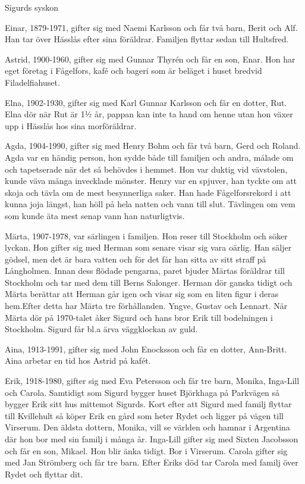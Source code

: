 Sigurds syskon


Einar, 1879-1971, gifter sig med Naemi  Karlsson och får två barn, Berit och Alf. Han tar över Hässlås efter sina föräldrar. Familjen flyttar sedan till Hultsfred.


Astrid, 1900-1960, gifter sig med Gunnar Thyrén och får en son, Enar. Hon har eget företag i Fågelfors, kafé och bageri som är beläget i huset bredvid Filadelfiahuset.


Elna, 1902-1930, gifter sig med Karl Gunnar Karlsson och får en dotter, Rut. Elna dör när Rut är 1½ år, pappan kan inte ta hand om henne utan hon växer upp i Hässlås hos sina morföräldrar.


Agda, 1904-1990, gifter sig med Henry Bohm och får två barn, Gerd och Roland. Agda var en händig person, hon sydde både till familjen och andra, målade om och tapetserade när det så behövdes i hemmet. Hon var duktig vid vävstolen, kunde väva många invecklade mönster. Henry var en spjuver, han tyckte om att skoja och tävla om de mest besynnerliga saker. Han hade Fågelforsrekord i att kunna joja längst, han höll på hela natten och vann till slut. Tävlingen om vem som kunde äta mest senap vann han naturligtvis.


Märta, 1907-1978, var särlingen i familjen. Hon reser till Stockholm och söker lyckan. Hon gifter sig med Herman som senare visar sig vara oärlig. Han säljer gödsel, men det är bara vatten och för det får han sitta av sitt straff på Långholmen. Innan dess flödade pengarna, paret bjuder Märtas föräldrar till Stockholm och tar med dem till Berns Salonger. Herman dör ganska tidigt och Märta berättar att Herman går igen och visar sig som en liten figur i deras hem.Efter detta har Märta tre förhållanden. Yngve, Gustav och Lennart. När Märta dör på 1970-talet åker Sigurd och hans bror Erik till bodelningen i Stockholm. Sigurd får bl.a ärva väggklockan av guld.


Aina, 1913-1991, gifter sig med John Enocksson och får en dotter, Ann-Britt. Aina arbetar en tid hos Astrid på kafét.


Erik, 1918-1980, gifter sig med Eva Petersson och får tre barn, Monika, Inga-Lill och Carola. Samtidigt som Sigurd bygger huset Björkhaga på Parkvägen så bygger Erik sitt hus mittemot Sigurds. Kort efter att Sigurd med familj flyttar till Kvillehult så köper Erik en gård som heter Rydet och ligger på vägen till Virserum. Den äldsta dottern, Monika, vill se världen och hamnar i Argentina där hon bor med sin familj i många år. Inga-Lill gifter sig med Sixten Jacobsson och får en son, Mikael. Hon blir änka tidigt. Bor i Virserum. Carola gifter sig med Jan Strömberg och får tre barn. Efter Eriks död tar Carola med familj över Rydet och flyttar dit.


